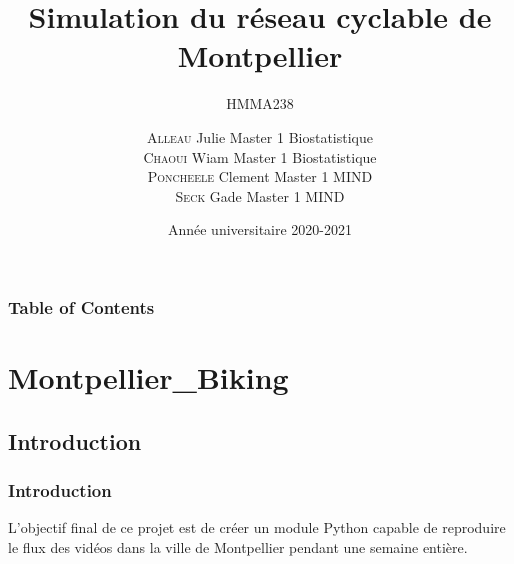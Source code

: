 \documentclass{beamer}
\title[] %
{Simulation du réseau cyclable de Montpellier}
\subtitle{HMMA238}
\author[]
{
\textsc{Alleau} Julie {\sc }  Master 1 Biostatistique \\  
\textsc{Chaoui} Wiam {\sc }   Master 1 Biostatistique\\  
\textsc{Poncheele} Clement {\sc }  Master 1 MIND     \\
\textsc{Seck} Gade {\sc }  Master 1 MIND \\}
\date[]  %
{Année universitaire 2020-2021}
\begin{document}
\frame{\titlepage}

\begin{frame}
\frametitle{Table of Contents}
    \tableofcontents
\end{frame}


\section{Montpellier\_Biking}
\subsection{Introduction}

\begin{frame}
\frametitle{Introduction}
L'objectif final de ce projet est de créer un module Python capable de reproduire le flux des vidéos dans la ville de Montpellier pendant une semaine entière.
\end{frame}
\end{document}
